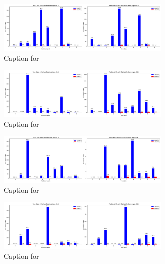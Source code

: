 \documentclass{article}
\begin{document}
\begin{figure}[!htbp]
\centering
\includegraphics[width=0.75\textwidth]{combined_class_boundary_pgd/combined_class_9_misclassifications_eps_0.2.png}
\caption{Caption for }
\label{fig:combined_class_9_misclassifications_eps_0.2.png}
\end{figure}

\begin{figure}[!htbp]
\centering
\includegraphics[width=0.75\textwidth]{combined_class_boundary_pgd/combined_class_1_misclassifications_eps_0.3.png}
\caption{Caption for }
\label{fig:combined_class_1_misclassifications_eps_0.3.png}
\end{figure}

\begin{figure}[!htbp]
\centering
\includegraphics[width=0.75\textwidth]{combined_class_boundary_pgd/combined_class_0_misclassifications_eps_0.3.png}
\caption{Caption for }
\label{fig:combined_class_0_misclassifications_eps_0.3.png}
\end{figure}

\begin{figure}[!htbp]
\centering
\includegraphics[width=0.75\textwidth]{combined_class_boundary_pgd/combined_class_3_misclassifications_eps_0.3.png}
\caption{Caption for }
\label{fig:combined_class_3_misclassifications_eps_0.3.png}
\end{figure}
\end{document}
